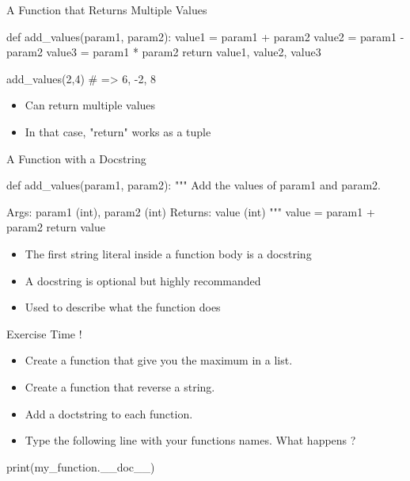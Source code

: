 \documentclass[serif, aspectratio=169]{beamer}
\begin{document}
\begin{frame}[fragile]{A Function that Returns Multiple Values}
    \begin{pythoncode}
    def add_values(param1, param2):
        value1 = param1 + param2
        value2 = param1 - param2
        value3 = param1 * param2
        return value1, value2, value3

    add_values(2,4) # => 6, -2, 8
    \end{pythoncode}
    \begin{block}{}
        \begin{itemize}
            \item Can return multiple values
            \item In that case, "return" works as a tuple
        \end{itemize}
    \end{block}
\end{frame}

\begin{frame}[fragile]{A Function with a Docstring}
    \begin{pythoncode}
    def add_values(param1, param2):
        """
        Add the values of param1 and param2.

        Args: param1 (int), param2 (int)
        Returns: value (int)
        """
        value = param1 + param2
        return value
    \end{pythoncode}
    \begin{block}{}
        \begin{itemize}
            \item The first string literal inside a function body is a docstring
            \item A docstring is optional but highly recommanded
            \item Used to describe what the function does
        \end{itemize}
    \end{block}
\end{frame}

\begin{exoframe}{Exercise Time !}
    \begin{block}{}
        \begin{itemize} \color{white}
            \item[1.] Create a function that give you the maximum in a list.
            \item[2.] Create a function that reverse a string.
            \item[3.] Add a doctstring to each function.
            \item[4.] Type the following line with your functions names. What happens ?    
        \end{itemize}
    \end{block}
    \vspace{10pt}
    \begin{center}
        \Large
        print(my\_function.\_\_doc\_\_)
    \end{center}
\end{exoframe}
\end{document}
